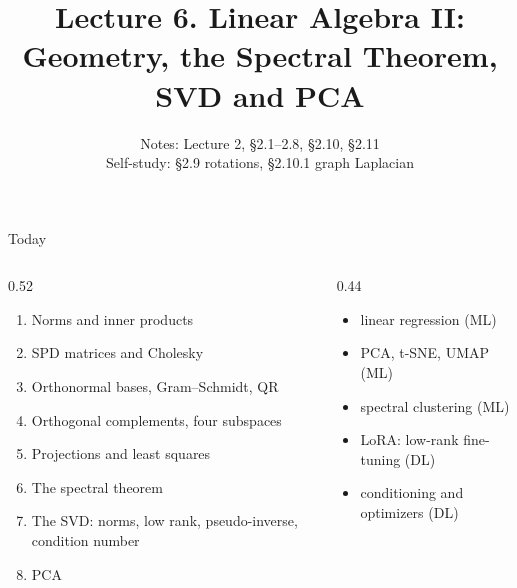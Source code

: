 \documentclass[aspectratio=1610,11pt]{beamer}
\title[Lecture 6 · Linear Algebra II]{Lecture 6. Linear Algebra II:\\ Geometry, the Spectral Theorem, SVD and PCA}
\subtitle{Notes: Lecture 2, \S2.1--2.8, \S2.10, \S2.11\\ Self-study: \S2.9 rotations, \S2.10.1 graph Laplacian}
\begin{document}
\begin{frame}[plain]
    \titlepage
\end{frame}

\begin{frame}{Today}
    \begin{columns}[T]
        \begin{column}{0.52\linewidth}
            \begin{enumerate}\small
                \item Norms and inner products
                \item SPD matrices and Cholesky
                \item Orthonormal bases, Gram--Schmidt, QR
                \item Orthogonal complements, four subspaces
                \item Projections and least squares
                \item The spectral theorem
                \item The SVD: norms, low rank, pseudo-inverse, condition number
                \item PCA
            \end{enumerate}
        \end{column}
        \begin{column}{0.44\linewidth}
            \begin{mlbox}[Used in]
                \small
                \begin{itemize}
                    \item linear regression (ML)
                    \item PCA, t-SNE, UMAP (ML)
                    \item spectral clustering (ML)
                    \item LoRA: low-rank fine-tuning (DL)
                    \item conditioning and optimizers (DL)
                \end{itemize}
            \end{mlbox}
        \end{column}
    \end{columns}
\end{frame}
\end{document}
